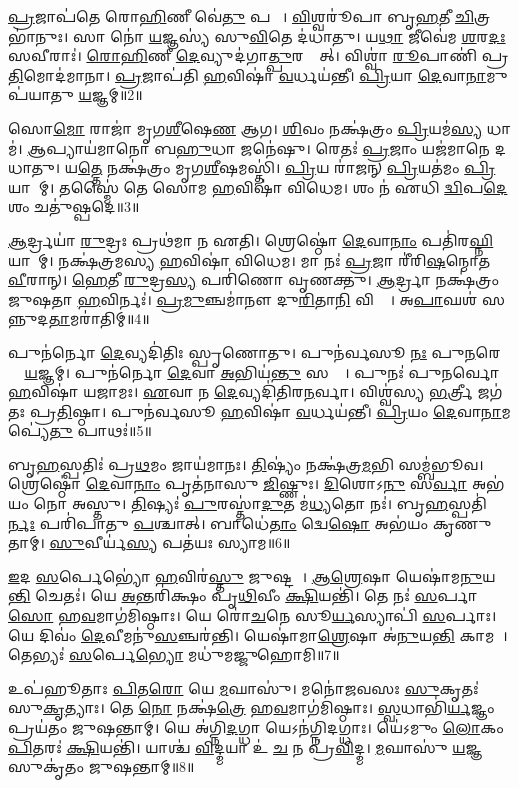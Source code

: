 \ul{𑌪𑍍𑌰}𑌜𑌾𑌪॑𑌤𑍇 𑌰𑍋\ul{𑌹𑌿}𑌣𑍀 𑌵𑍇॑\ul{𑌤𑍁} 𑌪𑌤𑍍𑌨𑍀᳚। 
\ul{𑌵𑌿}𑌶𑍍𑌵𑌰𑍂॑𑌪𑌾 𑌬𑍃\ul{𑌹}𑌤𑍀 \ul{𑌚𑌿}𑌤𑍍𑌰𑌭𑌾॑𑌨𑍁𑌃। 
𑌸𑌾 𑌨𑍋॑ \ul{𑌯}𑌜𑍍𑌞𑌸𑍍𑌯॑ 𑌸𑍁\ul{𑌵𑌿}𑌤𑍇 𑌦॑𑌧𑌾𑌤𑍁। 
𑌯\ul{𑌥𑌾} 𑌜𑍀𑌵𑍇॑𑌮 \ul{𑌶}𑌰\ul{𑌦𑌃} 𑌸𑌵𑍀𑌰𑌾𑌃॑। 
\ul{𑌰𑍋}\ul{𑌹𑌿}𑌣𑍀 \ul{𑌦𑍇}𑌵𑍍𑌯𑍁𑌦॑𑌗𑌾\ul{𑌤𑍍𑌪𑍁}𑌰𑌸𑍍𑌤𑌾᳚𑌤𑍍। 
𑌵𑌿𑌶𑍍𑌵𑌾॑ \ul{𑌰𑍂}𑌪𑌾𑌣𑌿॑ 𑌪𑍍𑌰\ul{𑌤𑌿}𑌮𑍋𑌦॑𑌮𑌾𑌨𑌾। 
\ul{𑌪𑍍𑌰}𑌜𑌾𑌪॑𑌤𑌿 \ul{𑌹}𑌵𑌿𑌷𑌾॑ \ul{𑌵}𑌰𑍍𑌧𑌯॑𑌨𑍍𑌤𑍀। 
\ul{𑌪𑍍𑌰𑌿}𑌯𑌾 \ul{𑌦𑍇}𑌵𑌾\ul{𑌨𑌾}𑌮𑍁𑌪॑𑌯𑌾𑌤𑍁 \ul{𑌯}𑌜𑍍𑌞𑌮𑍍॥2॥ 

𑌸𑍋\ul{𑌮𑍋} 𑌰𑌾𑌜𑌾॑ 𑌮𑍃𑌗\ul{𑌶𑍀}\ar{}𑌷𑍇\ul{𑌣} 𑌆𑌗\snn{}। 
\ul{𑌶𑌿}𑌵𑌂 𑌨𑌕𑍍𑌷॑𑌤𑍍𑌰𑌂 \ul{𑌪𑍍𑌰𑌿}𑌯𑌮॑\ul{𑌸𑍍𑌯} 𑌧𑌾𑌮॑। 
\ul{𑌆}𑌪𑍍𑌯𑌾𑌯॑𑌮𑌾𑌨𑍋 𑌬\ul{𑌹𑍁}𑌧𑌾 𑌜𑌨𑍇॑𑌷𑍁। 
𑌰𑍇𑌤𑌃॑ \ul{𑌪𑍍𑌰}𑌜𑌾𑌂 𑌯𑌜॑𑌮𑌾𑌨𑍇 𑌦𑌧𑌾𑌤𑍁। 
𑌯\ul{𑌤𑍍𑌤𑍇} 𑌨𑌕𑍍𑌷॑𑌤𑍍𑌰𑌂 𑌮𑍃𑌗\ul{𑌶𑍀}\ar{}𑌷𑌮𑌸𑍍𑌤𑌿॑। 
\ul{𑌪𑍍𑌰𑌿}𑌯 𑌰𑌾॑𑌜𑌨𑍍 \ul{𑌪𑍍𑌰𑌿}𑌯𑌤॑𑌮𑌂 \ul{𑌪𑍍𑌰𑌿}𑌯𑌾𑌣𑌾᳚𑌮𑍍। 
𑌤𑌸𑍍𑌮𑍈॑ 𑌤𑍇 𑌸𑍋𑌮 \ul{𑌹}𑌵𑌿𑌷𑌾॑ 𑌵𑌿𑌧𑍇𑌮। 
𑌶𑌂 𑌨॑ 𑌏𑌧𑌿 \ul{𑌦𑍍𑌵𑌿}𑌪\ul{𑌦𑍇} 𑌶𑌂 𑌚𑌤𑍁॑𑌷𑍍𑌪𑌦𑍇॥3॥ 

\ul{𑌆}𑌰𑍍𑌦𑍍𑌰𑌯𑌾॑ \ul{𑌰𑍁}𑌦𑍍𑌰𑌃 𑌪𑍍𑌰𑌥॑𑌮𑌾 𑌨 𑌏𑌤𑌿। 
𑌶𑍍𑌰𑍇𑌷𑍍𑌠𑍋॑ \ul{𑌦𑍇}𑌵𑌾\ul{𑌨𑌾𑌂} 𑌪𑌤𑌿॑𑌰\ul{𑌘𑍍𑌨𑌿}𑌯𑌾𑌨𑌾᳚𑌮𑍍। 
𑌨𑌕𑍍𑌷॑𑌤𑍍𑌰𑌮𑌸𑍍𑌯 \ul{𑌹}𑌵𑌿𑌷𑌾॑ 𑌵𑌿𑌧𑍇𑌮। 
𑌮𑌾 𑌨𑌃॑ \ul{𑌪𑍍𑌰}𑌜𑌾 𑌰𑍀॑𑌰𑌿\ul{𑌷}𑌨𑍍𑌮𑍋𑌤 \ul{𑌵𑍀}𑌰𑌾𑌨𑍍। 
\ul{𑌹𑍇}𑌤𑍀 \ul{𑌰𑍁}𑌦𑍍𑌰\ul{𑌸𑍍𑌯} 𑌪𑌰𑌿॑𑌣𑍋 𑌵𑍃𑌣𑌕𑍍𑌤𑍁। 
\ul{𑌆}𑌰𑍍𑌦𑍍𑌰𑌾 𑌨𑌕𑍍𑌷॑𑌤𑍍𑌰𑌂 𑌜𑍁𑌷𑌤𑌾 \ul{𑌹}𑌵𑌿𑌰𑍍𑌨𑌃॑। 
\ul{𑌪𑍍𑌰}\ul{𑌮𑍁}𑌞𑍍𑌚𑌮𑌾॑𑌨𑍗 𑌦𑍁\ul{𑌰𑌿}𑌤𑌾\ul{𑌨𑌿} 𑌵𑌿𑌶𑍍𑌵𑌾᳚। 
𑌅\ul{𑌪𑌾}𑌘𑌶॑ 𑌸𑌨𑍍𑌨𑍁𑌦\ul{𑌤𑌾}𑌮𑌰𑌾॑𑌤𑌿𑌮𑍍॥4॥ 

𑌪𑍁𑌨॑𑌰𑍍𑌨𑍋 \ul{𑌦𑍇}𑌵𑍍𑌯𑌦𑌿॑𑌤𑌿𑌃 𑌸𑍍𑌪𑍃𑌣𑍋𑌤𑍁। 
𑌪𑍁𑌨॑𑌰𑍍𑌵𑌸𑍂 \ul{𑌨𑌃} 𑌪𑍁\ul{𑌨}𑌰𑍇𑌤𑌾𑌂᳚ \ul{𑌯}𑌜𑍍𑌞𑌮𑍍। 
𑌪𑍁𑌨॑𑌰𑍍𑌨𑍋 \ul{𑌦𑍇}𑌵𑌾 \ul{𑌅}𑌭𑌿𑌯॑\ul{𑌨𑍍𑌤𑍁} 𑌸𑌰𑍍𑌵𑍇᳚। 
𑌪𑍁𑌨𑌃॑ 𑌪𑍁𑌨𑌰𑍍𑌵𑍋 \ul{𑌹}𑌵𑌿𑌷𑌾॑ 𑌯𑌜𑌾𑌮𑌃। 
\ul{𑌏}𑌵𑌾 𑌨 \ul{𑌦𑍇}𑌵𑍍𑌯𑌦𑌿॑𑌤𑌿𑌰\ul{𑌨}𑌰𑍍𑌵𑌾। 
𑌵𑌿𑌶𑍍𑌵॑𑌸𑍍𑌯 \ul{𑌭}𑌰𑍍𑌤𑍍𑌰𑍀 𑌜𑌗॑𑌤𑌃 𑌪𑍍𑌰\ul{𑌤𑌿}𑌷𑍍𑌠𑌾। 
𑌪𑍁𑌨॑𑌰𑍍𑌵𑌸𑍂 \ul{𑌹}𑌵𑌿𑌷𑌾॑ \ul{𑌵}𑌰𑍍𑌧𑌯॑𑌨𑍍𑌤𑍀। 
\ul{𑌪𑍍𑌰𑌿}𑌯𑌂 \ul{𑌦𑍇}𑌵𑌾\ul{𑌨𑌾}𑌮𑌪𑍍𑌯𑍇॑\ul{𑌤𑍁} 𑌪𑌾𑌥𑌃॑॥5॥ 

𑌬𑍃\ul{𑌹}𑌸𑍍𑌪𑌤𑌿𑌃॑ 𑌪𑍍𑌰\ul{𑌥}𑌮𑌂 𑌜𑌾𑌯॑𑌮𑌾𑌨𑌃। 
\ul{𑌤𑌿}𑌷𑍍𑌯𑌂॑ 𑌨𑌕𑍍𑌷॑𑌤𑍍𑌰\ul{𑌮}𑌭𑌿 𑌸𑌮𑍍𑌬॑𑌭𑍂𑌵। 
𑌶𑍍𑌰𑍇𑌷𑍍𑌠𑍋॑ \ul{𑌦𑍇}𑌵𑌾\ul{𑌨𑌾𑌂} 𑌪𑍃𑌤॑𑌨𑌾𑌸𑍁  \ul{𑌜𑌿}𑌷𑍍𑌣𑍁𑌃। 
\ul{𑌦𑌿}𑌶𑍋𑌽\ul{𑌨𑍁} 𑌸\ul{𑌰𑍍𑌵𑌾} 𑌅𑌭॑𑌯𑌂 𑌨𑍋 𑌅𑌸𑍍𑌤𑍁। 
\ul{𑌤𑌿}𑌷𑍍𑌯𑌃॑ \ul{𑌪𑍁}𑌰𑌸𑍍𑌤𑌾॑\ul{𑌦𑍁}𑌤 𑌮॑\ul{𑌧𑍍𑌯}𑌤𑍋 𑌨𑌃॑। 
𑌬𑍃\ul{𑌹}𑌸𑍍𑌪𑌤𑌿॑\ul{𑌰𑍍𑌨𑌃} 𑌪𑌰𑌿॑𑌪𑌾𑌤𑍁 \ul{𑌪}𑌶𑍍𑌚𑌾𑌤𑍍। 
𑌬𑌾𑌧𑍇॑\ul{𑌤𑌾𑌂} 𑌦𑍍𑌵𑍇\ul{𑌷𑍋} 𑌅𑌭॑𑌯𑌂 𑌕𑍃𑌣𑍁𑌤𑌾𑌮𑍍। 
\ul{𑌸𑍁}𑌵𑍀𑌰𑍍𑌯॑\ul{𑌸𑍍𑌯} 𑌪𑌤॑𑌯𑌃 𑌸𑍍𑌯𑌾𑌮॥6॥ 

\ul{𑌇}𑌦 \ul{𑌸}𑌰𑍍𑌪𑍇𑌭𑍍𑌯𑍋॑ \ul{𑌹}𑌵𑌿𑌰॑\ul{𑌸𑍍𑌤𑍁} 𑌜𑍁𑌷𑍍𑌟𑌮𑍍᳚। 
\ul{𑌆}\ul{𑌶𑍍𑌰𑍇}𑌷𑌾 𑌯𑍇𑌷𑌾॑𑌮\ul{𑌨𑍁}𑌯\ul{𑌨𑍍𑌤𑌿} 𑌚𑍇𑌤𑌃॑। 
𑌯𑍇 \ul{𑌅}𑌨𑍍𑌤𑌰𑌿॑𑌕𑍍𑌷𑌂 𑌪𑍃\ul{𑌥𑌿}𑌵𑍀𑌂 \ul{𑌕𑍍𑌷𑌿}𑌯𑌨𑍍𑌤𑌿॑। 
𑌤𑍇 𑌨𑌃॑ \ul{𑌸}𑌰𑍍𑌪𑌾\ul{𑌸𑍋} 𑌹\ul{𑌵}𑌮𑌾𑌗॑𑌮𑌿𑌷𑍍𑌠𑌾𑌃। 
𑌯𑍇 𑌰𑍋॑\ul{𑌚}𑌨𑍇 𑌸𑍂\ul{𑌰𑍍𑌯}𑌸𑍍𑌯𑌾𑌪𑌿॑ \ul{𑌸}𑌰𑍍𑌪𑌾𑌃। 
𑌯𑍇 𑌦𑌿𑌵𑌂॑ \ul{𑌦𑍇}𑌵𑍀𑌮𑌨𑍁॑\ul{𑌸}𑌞𑍍𑌚𑌰॑𑌨𑍍𑌤𑌿। 
𑌯𑍇𑌷𑌾॑𑌮𑌾\ul{𑌶𑍍𑌰𑍇}𑌷𑌾 𑌅॑\ul{𑌨𑍁}𑌯\ul{𑌨𑍍𑌤𑌿} 𑌕𑌾𑌮𑌮𑍍᳚। 
𑌤𑍇𑌭𑍍𑌯𑌃॑ \ul{𑌸}𑌰𑍍𑌪𑍇\ul{𑌭𑍍𑌯𑍋} 𑌮𑌧𑍁॑𑌮𑌜𑍍𑌜𑍁𑌹𑍋𑌮𑌿॥7॥ 

𑌉𑌪॑𑌹𑍂𑌤𑌾𑌃 \ul{𑌪𑌿}𑌤\ul{𑌰𑍋} 𑌯𑍇 \ul{𑌮}𑌘𑌾𑌸𑍁॑। 
𑌮𑌨𑍋॑𑌜𑌵𑌸𑌃 \ul{𑌸𑍁}𑌕𑍃𑌤𑌃॑ 𑌸𑍁\ul{𑌕𑍃}𑌤𑍍𑌯𑌾𑌃। 
𑌤𑍇 \ul{𑌨𑍋} 𑌨𑌕𑍍𑌷॑\ul{𑌤𑍍𑌰𑍇} 𑌹\ul{𑌵}𑌮𑌾𑌗॑𑌮𑌿𑌷𑍍𑌠𑌾𑌃। 
\ul{𑌸𑍍𑌵}𑌧𑌾𑌭𑌿॑\ul{𑌰𑍍𑌯}𑌜𑍍𑌞𑌂 𑌪𑍍𑌰𑌯॑𑌤𑌂 𑌜𑍁𑌷𑌨𑍍𑌤𑌾𑌮𑍍। 
𑌯𑍇 𑌅॑𑌗𑍍𑌨𑌿\ul{𑌦}𑌗𑍍𑌧𑌾 𑌯𑍇𑌽𑌨॑𑌗𑍍𑌨𑌿𑌦𑌗𑍍𑌧𑌾𑌃। 
𑌯𑍇॑𑌽𑌮𑍁𑌂 \ul{𑌲𑍋}𑌕𑌂 \ul{𑌪𑌿}𑌤𑌰𑌃॑ \ul{𑌕𑍍𑌷𑌿}𑌯𑌨𑍍𑌤𑌿॑। 
𑌯𑌾𑌶𑍍𑌚॑ \ul{𑌵𑌿}𑌦𑍍𑌮𑌯𑌾 𑌉॑ \ul{𑌚} 𑌨 𑌪𑍍𑌰॑\ul{𑌵𑌿}𑌦𑍍𑌮। 
\ul{𑌮}𑌘𑌾𑌸𑍁॑ \ul{𑌯}𑌜𑍍𑌞 𑌸𑍁𑌕𑍃॑𑌤𑌂 𑌜𑍁𑌷𑌨𑍍𑌤𑌾𑌮𑍍॥8॥ 

